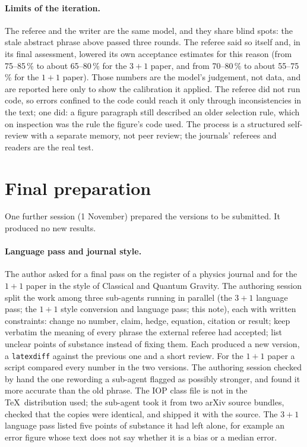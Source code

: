 \documentclass[11pt,a4paper]{article}
\begin{document}
\paragraph{Limits of the iteration.} The referee and the writer are the same model, and they share blind spots: the stale abstract phrase above passed three rounds. The referee said so itself and, in its final assessment, lowered its own acceptance estimates for this reason (from 75--85\,\% to about 65--80\,\% for the $3+1$ paper, and from 70--80\,\% to about 55--75\,\% for the $1+1$ paper). Those numbers are the model's judgement, not data, and are reported here only to show the calibration it applied. The referee did not run code, so errors confined to the code could reach it only through inconsistencies in the text; one did: a figure paragraph still described an older selection rule, which on inspection was the rule the figure's code used. The process is a structured self-review with a separate memory, not peer review; the journals' referees and readers are the real test.

\section{Final preparation}\label{sec:final}
One further session (1 November) prepared the versions to be submitted. It produced no new results.

\paragraph{Language pass and journal style.} The author asked for a final pass on the register of a physics journal and for the $1+1$ paper in the style of Classical and Quantum Gravity. The authoring session split the work among three sub-agents running in parallel (the $3+1$ language pass; the $1+1$ style conversion and language pass; this note), each with written constraints: change no number, claim, hedge, equation, citation or result; keep verbatim the meaning of every phrase the external referee had accepted; list unclear points of substance instead of fixing them. Each produced a new version, a \texttt{latexdiff} against the previous one and a short review. For the $1+1$ paper a script compared every number in the two versions. The authoring session checked by hand the one rewording a sub-agent flagged as possibly stronger, and found it more accurate than the old phrase. The IOP class file is not in the \TeX\ distribution used; the sub-agent took it from two arXiv source bundles, checked that the copies were identical, and shipped it with the source. The $3+1$ language pass listed five points of substance it had left alone, for example an error figure whose text does not say whether it is a bias or a median error.
\end{document}
